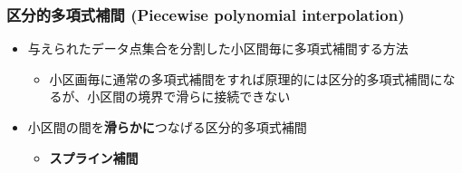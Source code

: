\documentclass[dvipdfmx,aspectratio=169,20pt]{beamer}
\newcommand{\myfontsetting}[3]{{\fontsize{#1}{#2}\selectfont #3}}
\begin{document}
\date[\todey]{}

\frame{\titlepage}

\begin{frame}
\frametitle{{\Large 区分的多項式補間 \myfontsetting{12pt}{12pt}{(Piecewise polynomial interpolation)}}}

\begin{itemize}
    \setlength{\itemsep}{0.5cm}
    \item \myfontsetting{20pt}{20pt}{与えられたデータ点集合を分割した小区間毎に多項式補間する方法}
    \begin{itemize}
        \item \myfontsetting{15pt}{15pt}{小区画毎に通常の多項式補間をすれば原理的には区分的多項式補間になるが、小区間の境界で滑らに接続できない}
    \end{itemize}
    \item \myfontsetting{20pt}{20pt}{小区間の間を{\bf 滑らかに}つなげる区分的多項式補間}
    \begin{itemize}
        \setlength{\itemsep}{0.15cm}
        \item \myfontsetting{20pt}{20pt}{\bf スプライン補間} 
    \end{itemize}
\end{itemize}
\end{frame}
\end{document}
